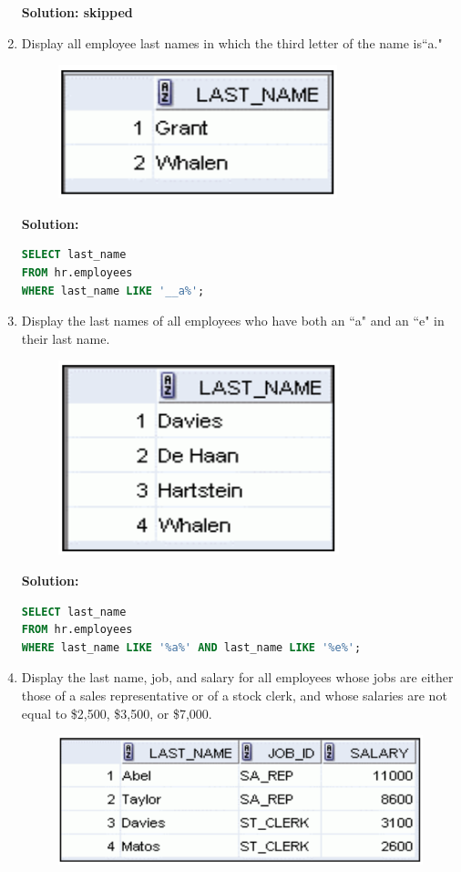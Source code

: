 \documentclass[a4paper,12pt]{article}
\begin{document}
\begin{enumerate}
\textbf{Solution: skipped}
    \item Display all employee last names in which the third letter of the name is``a."
\begin{figure}[h]
    \centering
    \includegraphics*[width=.4\linewidth]{graphics/212.png}
\end{figure}

\textbf{Solution: }
    \begin{lstlisting}[language=SQL, label={lst:employees_data}]
SELECT last_name
FROM hr.employees
WHERE last_name LIKE '__a%';
    \end{lstlisting}
    \item Display the last names of all employees who have both an ``a" and an ``e" in their last name.
\begin{figure}[h]
    \centering
    \includegraphics*[width=.4\linewidth]{graphics/213.png}
\end{figure}

\textbf{Solution: }
    \begin{lstlisting}[language=SQL, label={lst:employees_data}]
SELECT last_name
FROM hr.employees
WHERE last_name LIKE '%a%' AND last_name LIKE '%e%';
    \end{lstlisting}
    \item Display the last name, job, and salary for all employees whose jobs are either those of a sales
representative or of a stock clerk, and whose salaries are not equal to \$2,500, \$3,500, or \$7,000.
\begin{figure}[h]
    \centering
    \includegraphics*[width=.5\linewidth]{graphics/214.png}
\end{figure}


\end{enumerate}
\end{document}
